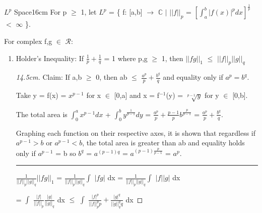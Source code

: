    \newpage



    \begin{definition}{$L^p$ Space}{16cm}
        For p $\geq$ 1, let $L^p$
        = \{ f: [a,b] $\rightarrow$ $\mathbb{C}$ {\color{lblue} $|$}
        $||f||_p$ = $[\int_a^b |f(x)|^p dx]^{\frac{1}{p}}$ $<$ $\infty$ \}.

        For complex f,g $\in$ $\mathscr{R}$:
    \end{definition}

    \begin{enumerate}[label=(\alph*), leftmargin=2.5cm, itemsep=0.1cm]
        \item {\color{lblue} Holder's Inequality}:        
            If $\frac{1}{p} + \frac{1}{q}$ = 1 where p,g $\geq$ 1, then
            $||fg||_1$ $\leq$ $||f||_p ||g||_q$        
    
            \begin{proof}[14.5cm]
                {\color{red} Claim}: If a,b $\geq$ 0,
                then ab $\leq$ $\frac{a^p}{p} + \frac{b^q}{q}$
                and equality only if $a^p = b^q$.
                
                Take y = f(x) = $x^{p-1}$ for x $\in$ [0,a]
                and x = f$^{-1}$(y) = $\sqrt[p-1]{y}$ for y $\in$ [0,b].

                The total area is
                $\int_0^a x^{p-1} dx$ + $\int_0^b y^{\frac{1}{p-1}} dy$
                = $\frac{a^p}{p} + \frac{p-1}{p}b^{\frac{p}{p-1}}$
                = $\frac{a^p}{p} + \frac{b^q}{q}$.

                Graphing each function on their respective axes,
                it is shown that regardless if $a^{p-1} > b$
                or $a^{p-1} < b$, the total area is greater than ab
                and equality holds only if $a^{p-1}$ = b
                so $b^q$ = $a^{(p-1)q}$ = $a^{(p-1)\frac{p}{p-1}}$ = $a^p$.

                \rule[0.1cm]{14.3cm}{0.01cm}

                \hspace{0.5cm}
                $\frac{1}{||f||_p ||g||_q} ||fg||_1$
                = $\frac{1}{||f||_p ||g||_q} \int$ $|f g|$ dx
                = $\frac{1}{||f||_p ||g||_q} \int$ $|f||g|$ dx

                \hspace{3.1cm}
                = $\int$ $\frac{|f|}{||f||_p} \frac{|g|}{||g||_q}$ dx
                $\leq$ $\int$ $\frac{|f|^p}{||f||_p^p p}
                                + \frac{|g|^q}{||g||_q^q q}$ dx


\end{proof}
\end{enumerate}
